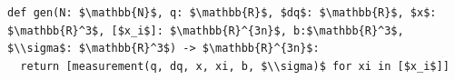 \documentclass[border=10pt]{standalone}
\begin{document}
\begin{lstlisting}
def gen(N: $\mathbb{N}$, q: $\mathbb{R}$, $dq$: $\mathbb{R}$, $x$: $\mathbb{R}^3$, [$x_i$]: $\mathbb{R}^{3n}$, b:$\mathbb{R}^3$, $\\sigma$: $\mathbb{R}^3$) -> $\mathbb{R}^{3n}$:
  return [measurement(q, dq, x, xi, b, $\\sigma)$ for xi in [$x_i$]]
\end{lstlisting}
\end{document}
